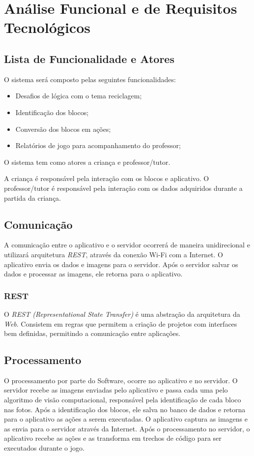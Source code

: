 \section{Análise Funcional e de Requisitos Tecnológicos}

    \subsection{Lista de Funcionalidade e Atores}
    O sistema será composto  pelas seguintes funcionalidades:
    \begin{itemize}
        \item Desafios de lógica com o tema reciclagem;
        \item Identificação dos blocos;
        \item Conversão dos blocos em ações;
        \item Relatórios de jogo para acompanhamento do professor;
    \end{itemize}
    
    O sistema tem como atores a criança e professor/tutor.
    
    A criança é responsável pela interação com os blocos e aplicativo.
    O professor/tutor é responsável pela interação com os dados adquiridos durante a partida da criança.
    
    \subsection{Comunicação}
    A comunicação entre o aplicativo e o servidor ocorrerá de maneira unidirecional e utilizará arquitetura \textit{REST}, através da conexão Wi-Fi com a Internet.
    O aplicativo envia os dados e imagens para o servidor. Após o servidor salvar os dados e processar as imagens, ele retorna para o aplicativo.
    
        \subsubsection{REST}
        O \textit{REST (Representational State Transfer)} é uma abstração da arquitetura da \textit{Web}. Consistem em regras que permitem a criação de projetos com interfaces bem definidas, permitindo a comunicação entre aplicações.
    
    
    \subsection{Processamento}
    O processamento por parte do Software, ocorre no aplicativo e no servidor.
    O servidor recebe as imagens enviadas pelo aplicativo e passa cada uma pelo algoritmo de visão computacional, responsável pela identificação de cada bloco nas fotos. Após a identificação dos blocos, ele salva no banco de dados e retorna para o aplicativo as ações a serem executadas.
    O aplicativo captura as imagens e as envia para o servidor através da Internet. Após o processamento no servidor, o aplicativo recebe as ações e as transforma em trechos de código para ser executados durante o jogo.
    
